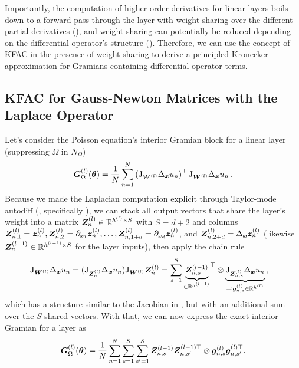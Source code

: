 Importantly, the computation of higher-order derivatives for linear layers boils down to a forward pass through the layer with weight sharing over the different partial derivatives (), and weight sharing can potentially be reduced depending on the differential operator's structure ().
Therefore, we can use the concept of KFAC in the presence of weight sharing to derive a principled Kronecker approximation for Gramians containing differential operator terms.

\subsection{KFAC for Gauss-Newton Matrices with the Laplace Operator}\label{sec:KFAC-Laplace}
Let's consider the Poisson equation's interior Gramian block for a linear layer (suppressing $\Omega$ in $N_{\Omega}$)
\begin{align*}
  {\bm{G}}^{(l)}_\Omega({\bm{\theta}})
  =
  \frac{1}{N}
  \sum_{n=1}^{N}
  \left(
  \mathrm{J}_{{\bm{W}}^{(l)}} \Delta_{\bm{x}} u_n  \right)^\top
  \mathrm{J}_{{\bm{W}}^{(l)}} \Delta_{\bm{x}} u_n\,.
\end{align*}
Because we made the Laplacian computation explicit through Taylor-mode autodiff (, specifically ), we can stack all output vectors that share the layer's weight into a matrix
${\bm{Z}}_n^{(l)} \in {\mathbb{R}}^{h^{(l)} \times S}$ with $S = d+2$ and columns ${\bm{Z}}_{n, 1}^{(l)} = {\bm{z}}_n^{(l)}, {\bm{Z}}_{n, 2}^{(l)} = \partial_{x_1}{\bm{z}}_n^{(l)}, \dots, {\bm{Z}}_{n, 1+d}^{(l)} = \partial_{x_d}{\bm{z}}_n^{(l)}$, and ${\bm{Z}}_{n, 2+d}^{(l)} = \Delta_{\bm{x}}{\bm{z}}_n^{(l)}$ (likewise ${\bm{Z}}_n^{(l-1)} \in {\mathbb{R}}^{h^{(l-1)} \times S}$ for the layer inputs), then apply the chain rule
\begin{align*}
  \mathrm{J}_{{\bm{W}}^{(l)}} \Delta_{\bm{x}} u_n
  &=
    (\mathrm{J}_{{\bm{Z}}_n^{(l)}}\Delta_{\bm{x}} u_n) \mathrm{J}_{{\bm{W}}^{(l)}} {\bm{Z}}_n^{(l)}
    =
    \sum_{s=1}^S
    {
    \underbrace{{\bm{Z}}^{(l-1)}_{n,s}}_{\in {\mathbb{R}}^{h^{(l-1)}}}
    }^{\top}
    \otimes
    \underbrace{\mathrm{J}_{{\bm{Z}}^{(l)}_{n,s}} \Delta_{{\bm{x}}}u_n}_{\eqqcolon {\bm{g}}_{n,s}^{(l)} \in {\mathbb{R}}^{h^{(l)}}}\,,
\end{align*}
which has a structure similar to the Jacobian in , but with an additional sum over the $S$ shared vectors. With that, we can now express the exact interior Gramian for a layer as
\begin{equation}\label{eq:laplace_gramian_block_exact}
  {\bm{G}}^{(l)}_\Omega({\bm{\theta}})
  =
  \frac{1}{N}
  \sum_{n=1}^N
  \sum_{s=1}^S
  \sum_{s'=1}^S
  {\bm{Z}}^{(l-1)}_{n,s} {\bm{Z}}^{(l-1)\top}_{n,s'} \otimes {\bm{g}}_{n,s}^{(l)} {\bm{g}}_{n,s'}^{(l)\top}.
\end{equation}
